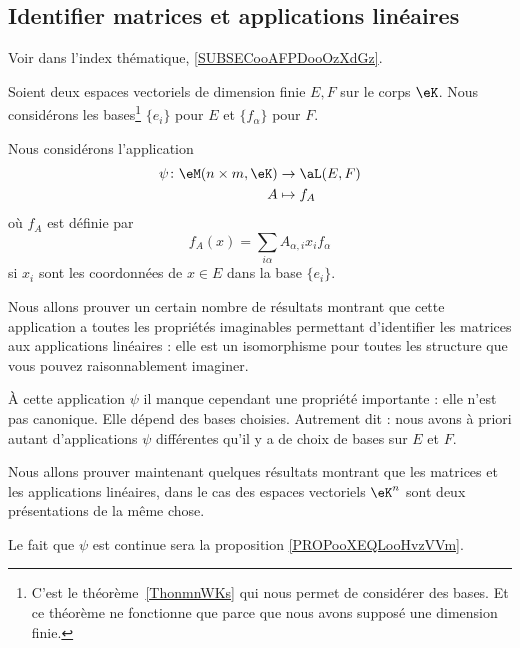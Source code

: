 \subsection{Identifier matrices et applications linéaires}

Voir dans l'index thématique, \ref{SUBSECooAFPDooOzXdGz}.

Soient deux espaces vectoriels de dimension finie \( E,F\) sur le corps \( \eK\). Nous considérons les bases\footnote{C'est le théorème~\ref{ThonmnWKs} qui nous permet de considérer des bases. Et ce théorème ne fonctionne que parce que nous avons supposé une dimension finie.} \( \{ e_i \}\) pour \( E\) et \( \{ f_{\alpha} \}\) pour \( F\).

\begin{definition}      \label{DEFooJVOAooUgGKme}
	Nous considérons l'application
	\begin{equation}        \label{EQooVZQWooMyFFeO}
		\begin{aligned}
			\psi\colon \eM(n\times m, \eK) & \to \aL(E,F) \\
			A                              & \mapsto f_A
		\end{aligned}
	\end{equation}
	où \( f_A\) est définie par
	\begin{equation}        \label{EQooBVGHooJhFbMs}
		f_A(x)=\sum_{i\alpha}A_{\alpha, i}x_if_{\alpha}
	\end{equation}
	si \( x_i\) sont les coordonnées de \( x\in E\) dans la base \( \{ e_i \}\).
\end{definition}

\begin{normaltext}
	Nous allons prouver un certain nombre de résultats montrant que cette application a toutes les propriétés imaginables permettant d'identifier les matrices aux applications linéaires : elle est un isomorphisme pour toutes les structure que vous pouvez raisonnablement imaginer.

	À cette application \( \psi\) il manque cependant une propriété importante : elle n'est pas canonique. Elle dépend des bases choisies. Autrement dit : nous avons à priori autant d'applications \( \psi\) différentes qu'il y a de choix de bases sur \( E\) et \( F\).

	Nous allons prouver maintenant quelques résultats montrant que les matrices et les applications linéaires, dans le cas des espaces vectoriels \( \eK^n\) sont deux présentations de la même chose.

	Le fait que \( \psi\) est continue sera la proposition \ref{PROPooXEQLooHvzVVm}.
\end{normaltext}


